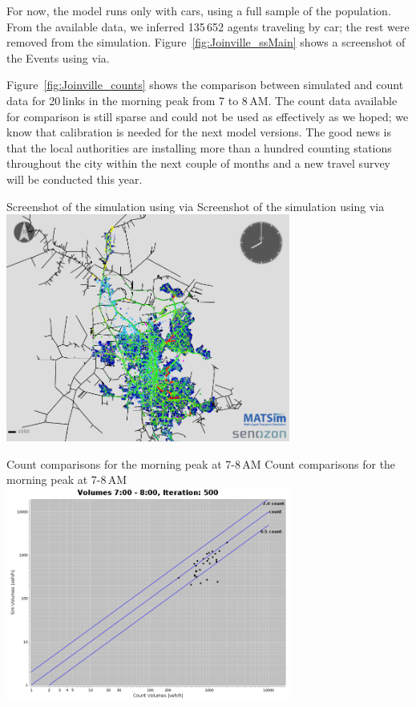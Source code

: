 For now, the model runs only with cars, using a full sample of the population. From the available data, we inferred 135\,652 agents traveling by car; the rest were removed from the simulation. Figure~\ref{fig:Joinville_ssMain} shows a screenshot of the Events using \gls{via}.

Figure~\ref{fig:Joinville_counts} shows the comparison between simulated and count data for 20\,links in the morning peak from 7 to 8\,AM. The count data available for comparison is still sparse and could not be used as effectively as we hoped; we know that calibration is needed for the next model versions. The good news is that the local authorities are installing more than a hundred counting stations throughout the city within the next couple of months and a new travel survey will be conducted this year. 

\createfigure%
{Screenshot of the simulation using \gls{via}}%
{Screenshot of the simulation using \gls{via}}%
{\label{fig:Joinville_ssMain}}%
{\includegraphics[width=0.7\textwidth, angle=0]{./scenarios/figures/Joinville_ssMain.png}}%
{}

\createfigure%
{Count comparisons for the morning peak at 7-8\,AM}%
{Count comparisons for the morning peak at 7-8\,AM}%
{\label{fig:Joinville_counts}}%
{\includegraphics[width=0.7\textwidth, angle=0]{./scenarios/figures/Joinville_LogManha.png}}%
{}

